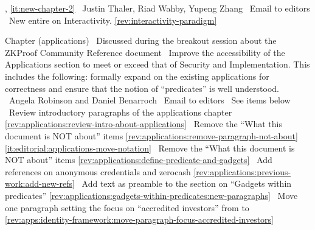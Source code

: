 \newcol {}, \ref{it:new-chapter-2}
\newcol \contributors\ Justin Thaler, Riad Wahby, Yupeng Zhang
				\submit\ Email to editors
				\Chan\ New entire  on Interactivity.
\newcol \ref{rev:interactivity-paradigm}
\rowendL
\myendIssue




Chapter (applications)
\newcol \ccontext\ Discussed during the breakout session about the ZKProof Community Reference document
				\propContrib\ Improve the accessibility of the Applications section to meet or exceed that of Security and Implementation. 
				This includes the following: formally expand on the existing applications for correctness and ensure that the notion of ``predicates'' is well understood.
\newcol {}
\newcol \contributors\ Angela Robinson and Daniel Benarroch
				\submit\ Email to editors
				\Chan\ See items below
\newcol 
\rowendL
\newcol
\newcol 
\newcol \Chan\ Review introductory paragraphs of the applications chapter
\newcol \ref{rev:applications:review-intro-about-applications}
\rowendL
\newcol
\newcol 
\newcol \Chan\ Remove the ``What this document is NOT about'' items
\newcol \ref{rev:applications:remove-paragraph-not-about}
\rowendL
\newcol
\newcol \ref{it:editorial:applications-move-notation}
\newcol \Chan\ Remove the ``What this document is NOT about'' items
\newcol \ref{rev:applications:define-predicate-and-gadgets}
\rowendL
\newcol
\newcol 
\newcol \Chan\ Add references on anonymous credentials and zerocash
\newcol \ref{rev:applications:previous-work:add-new-refs}
\rowendL
\newcol
\newcol 
\newcol \Chan\ Add text as preamble to the section on ``Gadgets within predicates''
\newcol \ref{rev:applications:gadgets-within-predicates:new-paragraphs}
\rowendL
\newcol
\newcol 
\newcol \Chan\ Move one paragraph setting the focus on ``accredited investors'' from 
 to 
\newcol \ref{rev:apps:identity-framework:move-paragraph-focus-accredited-investors}
\rowendL
\myendIssue




